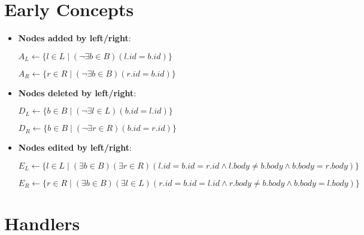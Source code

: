 \documentclass[a4paper]{article}
\begin{document}
    \section{Early Concepts}

    \begin{itemize}
        \item \textbf{Nodes added by left/right}:
        
        $A_L \leftarrow \{l \in L \mid (\lnot \exists b \in B)(l.id = b.id)\}$

        $A_R \leftarrow \{r \in R \mid (\lnot \exists b \in B)(r.id = b.id)\}$

        \item \textbf{Nodes deleted by left/right}:
        
        $D_L \leftarrow \{b \in B \mid (\lnot \exists l \in L)(b.id = l.id)\}$

        $D_R \leftarrow \{b \in B \mid (\lnot \exists r \in R)(b.id = r.id)\}$

        \item \textbf{Nodes edited by left/right}:
        
        $E_L \leftarrow \{l \in L \mid (\exists b \in B)(\exists r \in R)(l.id = b.id = r.id \land l.body \neq b.body \land b.body = r.body)\}$

        $E_R \leftarrow \{r \in R \mid (\exists b \in B)(\exists l \in L)(r.id = b.id = l.id \land r.body \neq b.body \land b.body = l.body)\}$
    \end{itemize}

    

    \section{Handlers}

    
    
    
    
    
\end{document}
